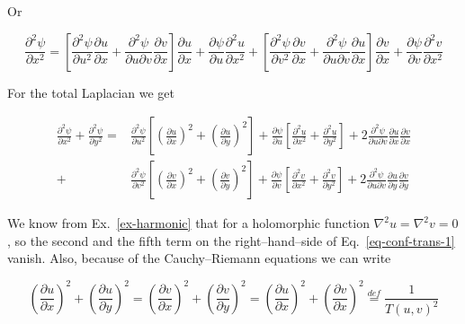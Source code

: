 Or

\begin{equation}
\frac{\partial^2 \psi}{\partial x^2} = \left[ \frac{\partial^2 \psi}{\partial
u^2 } \frac{\partial u}{\partial x} +  \frac{\partial^2 \psi}{\partial u
\partial v} \frac{\partial v}{\partial x} \right] \frac{\partial u}{\partial x}
 + \frac{\partial \psi}{\partial u}\frac{\partial^2 u}{\partial x^2} 
+ \left[ \frac{\partial^2 \psi}{\partial v^2 } \frac{\partial v}{\partial x} + 
\frac{\partial^2 \psi}{\partial u \partial v} \frac{\partial u}{\partial x}
\right] \frac{\partial v}{\partial x}  
+ \frac{\partial \psi}{\partial v}\frac{\partial^2 v}{\partial x^2}
\end{equation} 

For the total Laplacian we get

\begin{align}
\frac{\partial^2 \psi}{\partial x^2} + \frac{\partial^2 \psi}{\partial y^2}=& 
\frac{\partial^2 \psi}{\partial u^2 }  \left [ \left(\frac{\partial u}{\partial
x}\right)^2 
+ \left(\frac{\partial u}{\partial y}\right)^2\right]+ \frac{\partial
\psi}{\partial u} \left[ \frac{\partial^2 u}{\partial x^2} 
+ \frac{\partial^2 u}{\partial y^2} \right] 
+ 2\frac{\partial^2 \psi}{\partial u \partial v} \frac{\partial u}{\partial x}
\frac{\partial v}{\partial x}    \nonumber \\  
+& \frac{\partial^2 \psi}{\partial v^2}  \left[ \left(\frac{\partial v}{\partial
x}\right)^2  
+ \left(\frac{\partial v}{\partial y}\right)^2\right] + \frac{\partial
\psi}{\partial v} \left[ \frac{\partial^2 v}{\partial x^2} 
+ \frac{\partial^2 v}{\partial y^2} \right]
+ 2\frac{\partial^2 \psi}{\partial u \partial v} \frac{\partial u}{\partial y}
\frac{\partial v}{\partial y}
\label{eq-conf-trans-1}
\end{align} 

We know from Ex.~\ref{ex-harmonic} that for a holomorphic function $\nabla^2 u =
\nabla^2 v=0$, so the second and the fifth term on the right--hand--side of
Eq.~\ref{eq-conf-trans-1} vanish. Also, because of the Cauchy--Riemann equations
we can write

\begin{equation}
\left(\frac{\partial u}{\partial x}\right)^2 + \left(\frac{\partial u}{\partial
y}\right)^2 = \left(\frac{\partial v}{\partial x}\right)^2  +
\left(\frac{\partial v}{\partial y}\right)^2 = 
\left(\frac{\partial u}{\partial x}\right)^2 + \left(\frac{\partial v}{\partial
x}\right)^2 
 \stackrel{def}{=} \frac{1}{T(u,v)^2} \label{eq-T-factor}
\end{equation} 


